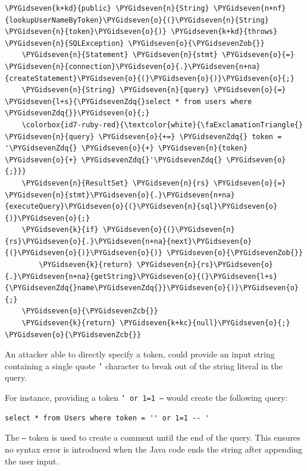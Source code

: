 \documentclass[a4paper,openany,12pt]{book}
\newcommand{\infobox}[1] {\colorbox{id7-bright-emerald-green}{\parbox{\textwidth}{\vspace{.75\baselineskip}\centering\parbox{0.95\textwidth}{\faIcon{info-circle} #1\vspace{.75\baselineskip}}}}}
\begin{document}
\begin{mdframed}[backgroundcolor=lightgrey]
\begin{Verbatim}[commandchars=\\\{\}]
\PYGidseven{k+kd}{public} \PYGidseven{n}{String} \PYGidseven{n+nf}{lookupUserNameByToken}\PYGidseven{o}{(}\PYGidseven{n}{String} \PYGidseven{n}{token}\PYGidseven{o}{)} \PYGidseven{k+kd}{throws} \PYGidseven{n}{SQLException} \PYGidseven{o}{\PYGidsevenZob{}}
    \PYGidseven{n}{Statement} \PYGidseven{n}{stmt} \PYGidseven{o}{=} \PYGidseven{n}{connection}\PYGidseven{o}{.}\PYGidseven{n+na}{createStatement}\PYGidseven{o}{(}\PYGidseven{o}{)}\PYGidseven{o}{;}
    \PYGidseven{n}{String} \PYGidseven{n}{query} \PYGidseven{o}{=} \PYGidseven{l+s}{\PYGidsevenZdq{}select * from users where \PYGidsevenZdq{}}\PYGidseven{o}{;}
    \colorbox{id7-ruby-red}{\textcolor{white}{\faExclamationTriangle{} \PYGidseven{n}{query} \PYGidseven{o}{+=} \PYGidsevenZdq{} token = '\PYGidsevenZdq{} \PYGidseven{o}{+} \PYGidseven{n}{token} \PYGidseven{o}{+} \PYGidsevenZdq{}'\PYGidsevenZdq{} \PYGidseven{o}{;}}}
    \PYGidseven{n}{ResultSet} \PYGidseven{n}{rs} \PYGidseven{o}{=} \PYGidseven{n}{stmt}\PYGidseven{o}{.}\PYGidseven{n+na}{executeQuery}\PYGidseven{o}{(}\PYGidseven{n}{sql}\PYGidseven{o}{)}\PYGidseven{o}{;}
    \PYGidseven{k}{if} \PYGidseven{o}{(}\PYGidseven{n}{rs}\PYGidseven{o}{.}\PYGidseven{n+na}{next}\PYGidseven{o}{(}\PYGidseven{o}{)}\PYGidseven{o}{)} \PYGidseven{o}{\PYGidsevenZob{}}
        \PYGidseven{k}{return} \PYGidseven{n}{rs}\PYGidseven{o}{.}\PYGidseven{n+na}{getString}\PYGidseven{o}{(}\PYGidseven{l+s}{\PYGidsevenZdq{}name\PYGidsevenZdq{}}\PYGidseven{o}{)}\PYGidseven{o}{;}
    \PYGidseven{o}{\PYGidsevenZcb{}}
    \PYGidseven{k}{return} \PYGidseven{k+kc}{null}\PYGidseven{o}{;}
\PYGidseven{o}{\PYGidsevenZcb{}}
\end{Verbatim}
\end{mdframed}

An attacker able to directly specify a token, could provide an input string containing a single quote \texttt{'}
character to break out of the string literal in the query.

For instance, providing a token \texttt{' or 1=1 --} would create the following query:

\begin{verbatim}
select * from Users where token = '' or 1=1 -- '
\end{verbatim}

\infobox{
The \texttt{--} token is used to create a comment until the end of the query.
This ensures no syntax error is introduced when the Java code ends the string after appending the user input.}
\end{document}
